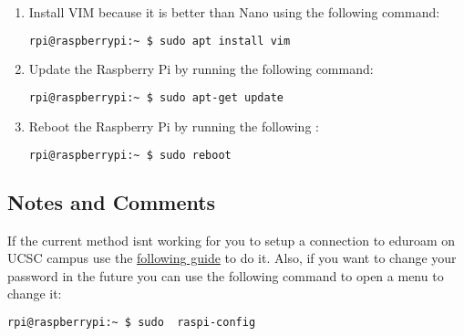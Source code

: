 \documentclass{article}
\begin{document}
\begin{enumerate}
\begin{lstlisting}[language=bash]
            \end{lstlisting}
        \item Install VIM because it is better than Nano using the following command: 
            \begin{lstlisting}[language=bash]
            rpi@raspberrypi:~ $ sudo apt install vim
            \end{lstlisting}
        \item Update the Raspberry Pi by running the following command:
            \begin{lstlisting}[language=bash]
            rpi@raspberrypi:~ $ sudo apt-get update
            \end{lstlisting}
        \item Reboot the Raspberry Pi by running the following :
            \begin{lstlisting}[language=bash]
            rpi@raspberrypi:~ $ sudo reboot
            \end{lstlisting}
    \end{enumerate}
    \subsection{Notes and Comments}
    If the current method isnt working for you to setup a connection to eduroam on UCSC 
    campus use the \href{https://its.ucsc.edu/wireless/eduroam-manual-config.html}{following guide} to do it. Also, 
    if you want to change your password in the future you can use the following command to open a menu to change it:
    \begin{lstlisting}[language=bash]
        rpi@raspberrypi:~ $ sudo  raspi-config
        \end{lstlisting}
\end{document}
